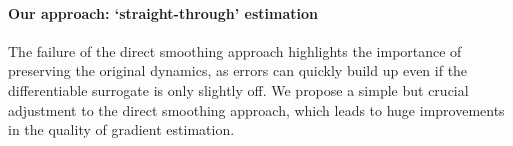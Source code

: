 \paragraph{Our approach: `straight-through' estimation}

The failure of the direct smoothing approach highlights the importance of preserving the original dynamics, as errors can quickly build up even if the differentiable surrogate is only slightly off. We propose a simple but crucial adjustment to the direct smoothing approach, which leads to huge improvements in the quality of gradient estimation. 

